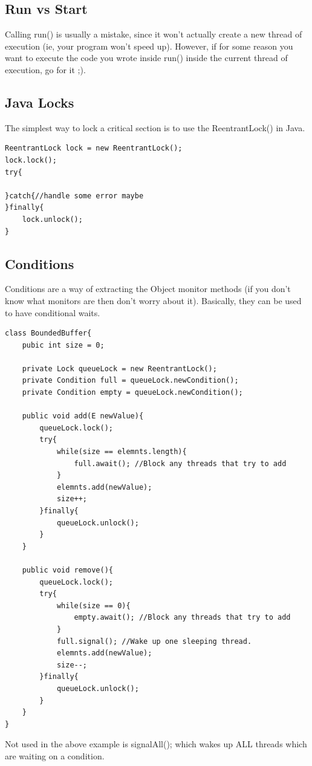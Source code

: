 \documentclass[12pt]{article}
\theoremstyle{definition}
\begin{document}
\subsection{Run vs Start}
Calling run() is usually a mistake, since it won't actually create a new thread of execution (ie, your program won't speed up). However, if for some reason you want to execute the code you wrote inside run() inside the current thread of execution, go for it ;).

\subsection{Java Locks}
The simplest way to lock a critical section is to use the ReentrantLock() in Java.
\begin{lstlisting}
ReentrantLock lock = new ReentrantLock();
lock.lock();
try{

}catch{//handle some error maybe
}finally{
	lock.unlock();
}
\end{lstlisting}

\subsection{Conditions}
Conditions are a way of extracting the Object monitor methods (if you don't know what monitors are then don't worry about it). Basically, they can be used to have conditional waits.
\begin{lstlisting}
class BoundedBuffer{
	pubic int size = 0;
	
	private Lock queueLock = new ReentrantLock();
	private Condition full = queueLock.newCondition();
	private Condition empty = queueLock.newCondition();
	
	public void add(E newValue){
		queueLock.lock();
		try{
			while(size == elemnts.length){
				full.await(); //Block any threads that try to add
			}
			elemnts.add(newValue);
			size++;
		}finally{
			queueLock.unlock();
		}		
	}
	
	public void remove(){
		queueLock.lock();
		try{
			while(size == 0){
				empty.await(); //Block any threads that try to add
			}
			full.signal(); //Wake up one sleeping thread.
			elemnts.add(newValue);
			size--;
		}finally{
			queueLock.unlock();
		}
	}
}

\end{lstlisting}

Not used in the above example is signalAll(); which wakes up ALL threads which are waiting on a condition.
\\ \linebreak
\end{document}
